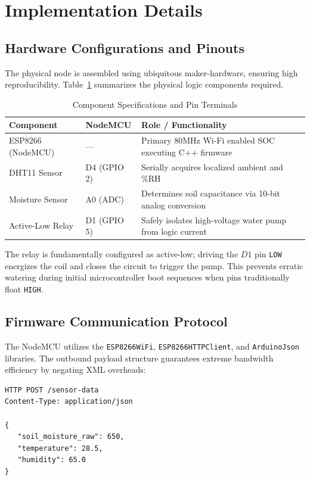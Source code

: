 \documentclass[conference]{IEEEtran}
\begin{document}
\section{Implementation Details}

\subsection{Hardware Configurations and Pinouts}
The physical node is assembled using ubiquitous maker-hardware, ensuring high reproducibility. Table~\ref{tab:hardware} summarizes the physical logic components required.

\begin{table}[htbp]
\caption{Component Specifications and Pin Terminals}
\label{tab:hardware}
\centering
\begin{tabular}{p{2.5cm}p{1.2cm}p{4cm}}
\toprule
\textbf{Component} & \textbf{NodeMCU} & \textbf{Role / Functionality} \\
\midrule
ESP8266 (NodeMCU)& --- & Primary 80MHz Wi-Fi enabled SOC executing C++ firmware \\
DHT11 Sensor & D4 (GPIO 2) & Serially acquires localized ambient \centering{$^\circ$C} and \%RH \\
Moisture Sensor & A0 (ADC) & Determines soil capacitance via 10-bit analog conversion \\
Active-Low Relay & D1 (GPIO 5) & Safely isolates high-voltage water pump from logic current \\
\bottomrule
\end{tabular}
\end{table}

The relay is fundamentally configured as active-low; driving the $D1$ pin \texttt{LOW} energizes the coil and closes the circuit to trigger the pump. This prevents erratic watering during initial microcontroller boot sequences when pins traditionally float \texttt{HIGH}.

\subsection{Firmware Communication Protocol}
The NodeMCU utilizes the \texttt{ESP8266WiFi}, \texttt{ESP8266HTTPClient}, and \texttt{ArduinoJson} libraries. The outbound payload structure guarantees extreme bandwidth efficiency by negating XML overheads: 
\begin{verbatim}
HTTP POST /sensor-data
Content-Type: application/json

{
   "soil_moisture_raw": 650,
   "temperature": 28.5,
   "humidity": 65.0
}
\end{verbatim}
\end{document}
